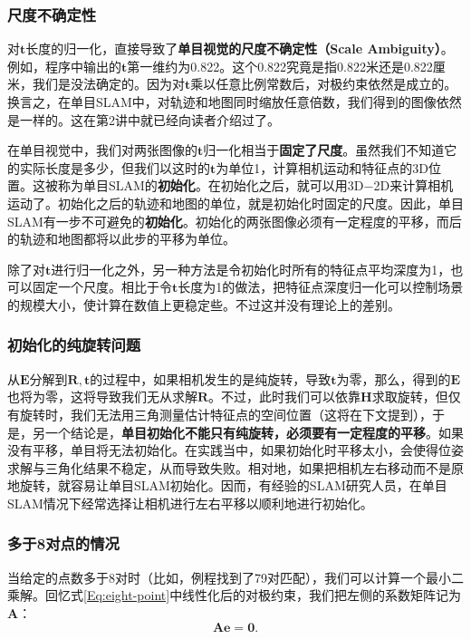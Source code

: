 \subsubsection{尺度不确定性}
对$\bm{t}$长度的归一化，直接导致了\textbf{单目视觉的尺度不确定性（Scale Ambiguity）}。例如，程序中输出的$\bm{t}$第一维约为0.822。这个0.822究竟是指0.822米还是0.822厘米，我们是没法确定的。因为对$\bm{t}$乘以任意比例常数后，对极约束依然是成立的。换言之，在单目SLAM中，对轨迹和地图同时缩放任意倍数，我们得到的图像依然是一样的。这在第2讲中就已经向读者介绍过了。

在单目视觉中，我们对两张图像的$\bm{t}$归一化相当于\textbf{固定了尺度}。虽然我们不知道它的实际长度是多少，但我们以这时的$\bm{t}$为单位1，计算相机运动和特征点的3D位置。这被称为单目SLAM的\textbf{初始化}。在初始化之后，就可以用3D−2D来计算相机运动了。初始化之后的轨迹和地图的单位，就是初始化时固定的尺度。因此，单目SLAM有一步不可避免的\textbf{初始化}。初始化的两张图像必须有一定程度的平移，而后的轨迹和地图都将以此步的平移为单位。

除了对$\bm{t}$进行归一化之外，另一种方法是令初始化时所有的特征点平均深度为1，也可以固定一个尺度。相比于令$\bm{t}$长度为1的做法，把特征点深度归一化可以控制场景的规模大小，使计算在数值上更稳定些。不过这并没有理论上的差别。

\subsubsection{初始化的纯旋转问题}
从$\bm{E}$分解到$\bm{R}, \bm{t}$的过程中，如果相机发生的是纯旋转，导致$\bm{t}$为零，那么，得到的$\bm{E}$也将为零，这将导致我们无从求解$\bm{R}$。不过，此时我们可以依靠$\bm{H}$求取旋转，但仅有旋转时，我们无法用三角测量估计特征点的空间位置（这将在下文提到），于是，另一个结论是，\textbf{单目初始化不能只有纯旋转，必须要有一定程度的平移}。如果没有平移，单目将无法初始化。在实践当中，如果初始化时平移太小，会使得位姿求解与三角化结果不稳定，从而导致失败。相对地，如果把相机左右移动而不是原地旋转，就容易让单目SLAM初始化。因而，有经验的SLAM研究人员，在单目SLAM情况下经常选择让相机进行左右平移以顺利地进行初始化。

\subsubsection{多于8对点的情况}
当给定的点数多于8对时（比如，例程找到了79对匹配），我们可以计算一个最小二乘解。回忆式\eqref{Eq:eight-point}中线性化后的对极约束，我们把左侧的系数矩阵记为$\bm{A}$：
\begin{equation}
\bm{A} \bm{e} = \bm{0} .
\end{equation}

